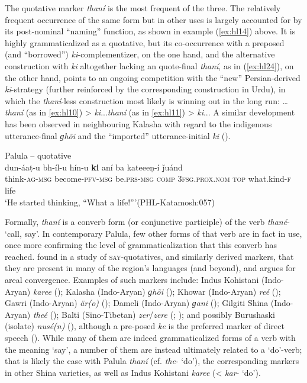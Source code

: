 \documentclass[output=paper]{langsci/langscibook}
\begin{document}
The quotative marker \textit{thaní} is the most frequent of the three. The relatively frequent occurrence of the same form but in other uses is largely accounted for by its post-nominal “naming” function, as shown in example ‎‎(\ref{ex:hl14}) above. It is highly grammaticalized as a quotative, but its co-occurrence with a preposed (and “borrowed”) \textit{ki}-complementizer, on the one hand, and the alternative construction with \textit{ki} altogether lacking an quote-final \textit{thaní}, as in ‎(\ref{ex:hl24}), on the other hand, points to an ongoing competition with the “new” Persian-derived \textit{ki}-strategy (further reinforced by the corresponding construction in Urdu), in which the \textit{thaní}-less construction most likely is winning out in the long run: …\textit{thaní} (as in \ref{ex:hl10}) > \textit{ki}...\textit{thaní} (as in \ref{ex:hl11}) > \textit{ki}... A similar development has been observed in neighbouring Kalasha with regard to the indigenous utterance-final \textit{ɡhõi} and the “imported” utterance-initial \textit{ki} (\citealt[266--324]{Bashir1988}).

\begin{exe}
\ex Palula -- quotative \label{ex:hl24}\\
	\gll dun-áaṭ-u bh-íl-u hín-u \textbf{ki} aní ba kateeeṇ-í ǰuánd\\
	think-\textsc{ag}-\textsc{msg} become-\textsc{pfv}-\textsc{msg} be.\textsc{prs}-\textsc{msg} \textsc{comp} 3\textsc{fsg}.\textsc{prox}.\textsc{nom} \textsc{top} what.kind-\textsc{f} life\\
	\trans ‘He started thinking, “What a life!”’(PHL-Katamosh:057) 
\end{exe}


Formally, \textit{thaní} is a converb form (or conjunctive participle) of the verb \textit{thané}- ‘call, say’. In contemporary Palula, few other forms of that verb are in fact in use, once more confirming the level of grammaticalization that this converb has reached. \cite{Bashir1996a} found in a study of \textsc{say}-quotatives, and similarly derived markers, that they are present in many of the region’s languages (and beyond), and argues for areal convergence. Examples of such markers include: Indus Kohistani (Indo-Aryan) \textit{karee} (\citealt[67--69]{Lubberger2014}); Kalasha (Indo-Aryan) \textit{ɡhõi} (\citealt[67]{Heegard2015}); Khowar (Indo-Aryan) \textit{reé} (\citealt[225--235]{Bashir1996a}); Gawri (Indo-Aryan) \textit{är(o)} (\citealt[147--149]{Baart1999}); Dameli (Indo-Aryan) \textit{ɡani} (\citealt[176--177]{Perder2013}); Gilgiti Shina (Indo-Aryan) \textit{theé} (\citealt[28]{RadloffShakil1998}); Balti (Sino-Tibetan) \textit{zer}/\textit{zere} (\citealt[270]{Bashir1996a}; \citealt[64]{Jones2009}); and possibly Burushaski (isolate) \textit{nusé(n)} (\citealt[262]{Bashir1996a}), although a pre-posed \textit{ke} is the preferred marker of direct speech (\citealt[193]{Berger1998}). While many of them are indeed grammaticalized forms of a verb with the meaning ‘say’, a number of them are instead ultimately related to a ‘do’-verb; that is likely the case with Palula \textit{thaní} (cf. \textit{the}- ‘do’), the corresponding markers in other Shina varieties, as well as Indus Kohistani \textit{karee} (< \textit{kar}- ‘do’).
 
\end{document}
